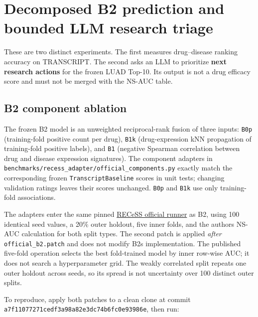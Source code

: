 \documentclass[
  10pt,
]{ctexart}
\author{}
\date{}
\newenvironment{Shaded}{}{}
\newcommand{\DataTypeTok}[1]{\textcolor[rgb]{0.56,0.13,0.00}{#1}}
\newcommand{\DecValTok}[1]{\textcolor[rgb]{0.25,0.63,0.44}{#1}}
\newcommand{\FunctionTok}[1]{\textcolor[rgb]{0.02,0.16,0.49}{#1}}
\newcommand{\NormalTok}[1]{#1}
\newcommand{\OperatorTok}[1]{\textcolor[rgb]{0.40,0.40,0.40}{#1}}
\newcommand{\VariableTok}[1]{\textcolor[rgb]{0.10,0.09,0.49}{#1}}
\begin{document}
\section{Decomposed B2 prediction and bounded LLM research
triage}\label{decomposed-b2-prediction-and-bounded-llm-research-triage}

These are two distinct experiments. The first measures drug--disease
ranking accuracy on TRANSCRIPT. The second asks an LLM to prioritize
\textbf{next research actions} for the frozen LUAD Top-10. Its output is
not a drug efficacy score and must not be merged with the NS-AUC table.

\subsection{B2 component ablation}\label{b2-component-ablation}

The frozen B2 model is an unweighted reciprocal-rank fusion of three
inputs: \texttt{B0p} (training-fold positive count per drug),
\texttt{B1k} (drug-expression kNN propagation of training-fold positive
labels), and \texttt{B1} (negative Spearman correlation between drug and
disease expression signatures). The component adapters in
\texttt{benchmarks/\allowbreak{}recess\_\allowbreak{}adapter/\allowbreak{}official\_\allowbreak{}components.\allowbreak{}py} exactly
match the corresponding frozen \texttt{TranscriptBaseline} scores in
unit tests; changing validation ratings leaves their scores unchanged.
\texttt{B0p} and \texttt{B1k} use only training-fold associations.

The adapters enter the same pinned
\href{https://github.com/RECeSS-EU-Project/benchmark-code}{RECeSS
official runner} as B2, using 100 identical seed values, a 20\% outer
holdout, five inner folds, and the author\textquotesingle s NS-AUC
calculation for both split types. The second patch is applied
\emph{after} \texttt{official\_\allowbreak{}b2.\allowbreak{}patch} and does not modify
B2\textquotesingle s implementation. The published five-fold operation
selects the best fold-trained model by inner row-wise AUC; it does not
search a hyperparameter grid. The weakly correlated split repeats one
outer holdout across seeds, so its spread is not uncertainty over 100
distinct outer splits.

To reproduce, apply both patches to a clean clone at commit
\texttt{a7f11077271ced\allowbreak{}f3a98a82e3dc74\allowbreak{}b6fc0e93986e}, then run:

\begin{Shaded}
\end{Shaded}
\end{document}
